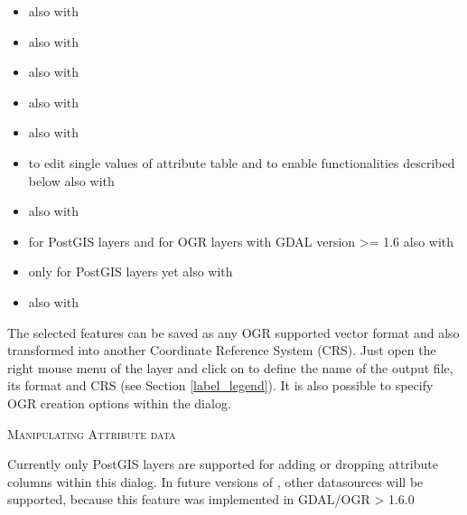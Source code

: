 \begin{itemize}[label=--]
\item {} also with 
\item {} also with 
\item {} also with 
\item {} also 
with 
\item {} also 
with 
\item {} to edit single values
of attribute table and to enable functionalities described below also with 
\item {} also with 
\item {} for PostGIS layers and for 
OGR layers with GDAL version >= 1.6 also with 
\item {} only for PostGIS layers 
yet also with 
\item {} also with 
\end{itemize}


The selected features can be saved as any OGR supported vector format and also
transformed into another Coordinate Reference System (CRS). Just open the right 
mouse menu of the layer and click on  to define 
the name of the output file, its format and CRS (see Section \ref{label_legend}). 
It is also possible to specify OGR creation options within the dialog.

\begin{Tip}\caption{\textsc{Manipulating Attribute data}}
Currently only PostGIS layers are supported for adding or dropping
attribute columns within this dialog. In future versions of \qg, other
datasources will be supported, because this feature was implemented in GDAL/OGR 
> 1.6.0
\end{Tip}

